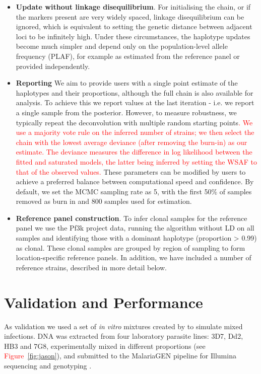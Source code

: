 \documentclass{bioinfo}
\begin{document}
\begin{itemize}
\item {\bf Update without linkage disequilibrium}. For initialising the chain, or if the markers present are very widely spaced, linkage disequilibrium can be ignored, which is equivalent to setting the genetic distance between adjacent loci to be infinitely high.  Under these circumstances, the haplotype updates become much simpler and depend only on the population-level allele frequency (PLAF), for example as estimated from the reference panel or provided independently.

\item {\bf Reporting} We aim to provide users with a single point estimate of the haplotypes and their proportions, although the full chain is also available for analysis.  To achieve this we report values at the last iteration - i.e. we report a single sample from the posterior.  However, to measure robustness, we typically repeat the deconvolution with multiple random starting points\textcolor{red}{. We use a majority vote rule on the inferred number of strains; we then select the chain with the lowest average deviance (after removing the burn-in) as our estimate. The deviance measures the difference in log likelihood between the fitted and saturated models, the latter being inferred by setting the WSAF to that of the observed values.} These parameters can be modified by users to achieve a preferred balance between computational speed and confidence.  By default, we set the MCMC sampling rate as 5, with the first 50\% of samples removed as burn in and 800 samples used for estimation.

\item {\bf Reference panel construction}. To infer clonal samples for the reference panel we use the Pf3k project data, running the algorithm without LD on all samples and identifying those with a dominant haplotype (proportion > 0.99) as clonal.  These clonal samples are grouped by region of sampling to form location-specific reference panels.  In addition, we have included a number of reference strains, described in more detail below.

\end{itemize}



\section{Validation and Performance}

As validation we used a set of {\it in vitro} mixtures created by \citet{Wendler2015} to simulate mixed infections. DNA was extracted from four laboratory parasite lines: 3D7, Dd2, HB3 and 7G8, experimentally mixed in different proportions (see \textcolor{red}{Figure~\ref{fig:jason}}), and submitted to the MalariaGEN pipeline \citep{MalariaGen2008} for Illumina sequencing and genotyping \citep{Manske2012}.
\end{document}

